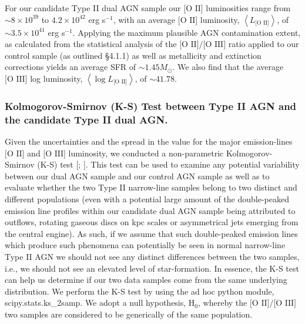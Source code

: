 For our candidate Type II dual AGN sample our $\text{[O II]}$ luminosities range from $\sim{8\times{10}^{39}}$ to $4.2\times{10}^{42}$ erg s$^{-1}$, with an average $\text{[O II]}$ luminosity, $\left\langle{L_{\text{[O II]}}}\right\rangle$, of $\sim{3.5\times{10^{41}}}$ erg s$^{-1}$. Applying the maximum plausible AGN contamination extent, as calculated from the statistical analysis of the $\text{[O II]}/\text{[O III]}$ ratio applied to our control sample (as outlined §4.1.1) as well as metallicity and extinction corrections yields an average SFR of $\sim{1.45}M_{\odot}$. We also find that the average $\text{[O III]}$ log  luminosity, $\left\langle\log{L_{\text{[O II]}}}\right\rangle$, of $\sim{41.78}$.      
 
\subsubsection{Kolmogorov-Smirnov (K-S) Test between Type II AGN and the candidate Type II dual AGN.}

Given the uncertainties and the spread in the value for the major emission-lines $\text{[O II]}$ and $\text{[O III]}$ luminosity, we conducted a non-parametric Kolmogorov-Smirnov (K-S) test [\cite{Peacock_1983}; \cite{Justel_1997}]. This test can be used to examine any potential variability between our dual AGN sample and our control AGN sample as well as to evaluate whether the two Type II narrow-line samples belong to two distinct and different populations (even with a potential large amount of the double-peaked emission line profiles within our candidate dual AGN sample being attributed to outflows, rotating gaseous discs on kpc scales or asymmetrical jets emerging from the central engine). As such, if we assume that such double-peaked emission lines which produce such phenomena can potentially be seen in normal narrow-line Type II AGN we should not see any distinct differences between the two samples, i.e., we should not see an elevated level of star-formation. In essence, the K-S test can help us determine if our two data samples come from the same underlying distribution. We perform the K-S test by using the ad hoc python module, scipy.stats.ks_2samp. We adopt a null hypothesis, $\text{H}_{0}$, whereby the $\text{[O II]}/\text{[O III]}$ two samples are considered to be generically of the same population.  

